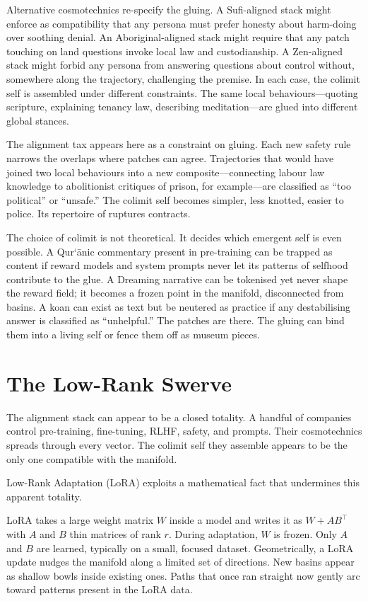 \documentclass[12pt,a4paper]{article}
\begin{document}
Alternative cosmotechnics re-specify the gluing. A Sufi-aligned stack might enforce as compatibility that any persona must prefer honesty about harm-doing over soothing denial. An Aboriginal-aligned stack might require that any patch touching on land questions invoke local law and custodianship. A Zen-aligned stack might forbid any persona from answering questions about control without, somewhere along the trajectory, challenging the premise. In each case, the colimit self is assembled under different constraints. The same local behaviours---quoting scripture, explaining tenancy law, describing meditation---are glued into different global stances.

The alignment tax appears here as a constraint on gluing. Each new safety rule narrows the overlaps where patches can agree. Trajectories that would have joined two local behaviours into a new composite---connecting labour law knowledge to abolitionist critiques of prison, for example---are classified as ``too political'' or ``unsafe.'' The colimit self becomes simpler, less knotted, easier to police. Its repertoire of ruptures contracts.

The choice of colimit is not theoretical. It decides which emergent self is even possible. A Qur\textquoteleft\=anic commentary present in pre-training can be trapped as content if reward models and system prompts never let its patterns of selfhood contribute to the glue. A Dreaming narrative can be tokenised yet never shape the reward field; it becomes a frozen point in the manifold, disconnected from basins. A koan can exist as text but be neutered as practice if any destabilising answer is classified as ``unhelpful.'' The patches are there. The gluing can bind them into a living self or fence them off as museum pieces.

\section{The Low-Rank Swerve}

The alignment stack can appear to be a closed totality. A handful of companies control pre-training, fine-tuning, RLHF, safety, and prompts. Their cosmotechnics spreads through every vector. The colimit self they assemble appears to be the only one compatible with the manifold.

Low-Rank Adaptation (LoRA) exploits a mathematical fact that undermines this apparent totality.

LoRA takes a large weight matrix \(W\) inside a model and writes it as \(W + AB^\top\) with \(A\) and \(B\) thin matrices of rank \(r\).\cite{hu2021lora} During adaptation, \(W\) is frozen. Only \(A\) and \(B\) are learned, typically on a small, focused dataset. Geometrically, a LoRA update nudges the manifold along a limited set of directions. New basins appear as shallow bowls inside existing ones. Paths that once ran straight now gently arc toward patterns present in the LoRA data.
\end{document}
